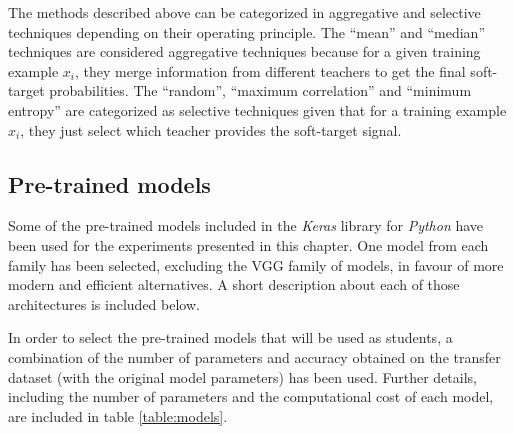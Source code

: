  The methods described above can be categorized in aggregative and selective techniques depending on their operating principle. The ``mean'' and ``median'' techniques are considered aggregative techniques because for a given training example $x_i$, they merge information from different teachers to get the final soft-target probabilities. The ``random'', ``maximum correlation'' and ``minimum entropy'' are categorized as selective techniques given that for a training example $x_i$, they just select which teacher provides the soft-target signal.  

 \subsection{Pre-trained models}
 Some of the pre-trained models included in the \textit{Keras} library for \textit{Python} \autocite{chollet2015keras} have been used for the experiments presented in this chapter. One model from each family has been selected, excluding the VGG family of models, in favour of more modern and efficient alternatives. A short description about each of those architectures is included below.
 
  In order to select the pre-trained models that will be used as students, a combination of the number of parameters and accuracy obtained on the transfer dataset (with the original model parameters) has been used. Further details, including the number of parameters and the computational cost of each model, are included in table \ref{table:models}.

